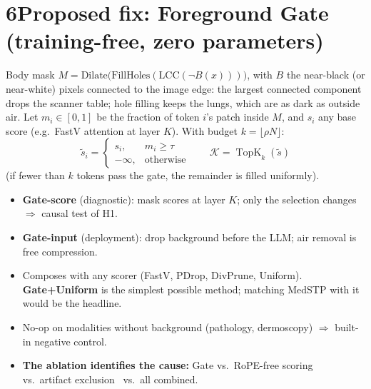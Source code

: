 \documentclass[11pt]{article}
\begin{document}
\section*{6\quad Proposed fix: Foreground Gate (training-free, zero parameters)}
Body mask $M=\mathrm{Dilate}\big(\mathrm{FillHoles}(\mathrm{LCC}(\neg B(x)))\big)$, with $B$ the near-black (or near-white) pixels connected to the image edge: the
largest connected component drops the scanner table; hole filling keeps the lungs, which are
as dark as outside air. Let $m_i\in[0,1]$ be the fraction of token $i$'s patch inside $M$, and
$s_i$ any base score (e.g.\ FastV attention at layer $K$). With budget $k=\lfloor\rho N\rfloor$:
\[
\tilde s_i=\begin{cases} s_i, & m_i\ge\tau\\ -\infty, & \text{otherwise}\end{cases}
\qquad
\mathcal{K}=\operatorname{TopK}_k(\tilde s)
\]
(if fewer than $k$ tokens pass the gate, the remainder is filled uniformly).
\begin{itemize}
  \item \textbf{Gate-score} (diagnostic): mask scores at layer $K$; only the selection changes
        $\Rightarrow$ causal test of H1.
  \item \textbf{Gate-input} (deployment): drop background before the LLM; air removal is free
        compression.
  \item Composes with any scorer (FastV, PDrop, DivPrune, Uniform). \textbf{Gate+Uniform} is the
        simplest possible method; matching MedSTP with it would be the headline.
  \item No-op on modalities without background (pathology, dermoscopy) $\Rightarrow$ built-in
        negative control.
  \item \textbf{The ablation identifies the cause:} Gate vs.\ RoPE-free scoring~\cite{feather}
        vs.\ artifact exclusion~\cite{ttreg} vs.\ all combined.
\end{itemize}

\end{document}
